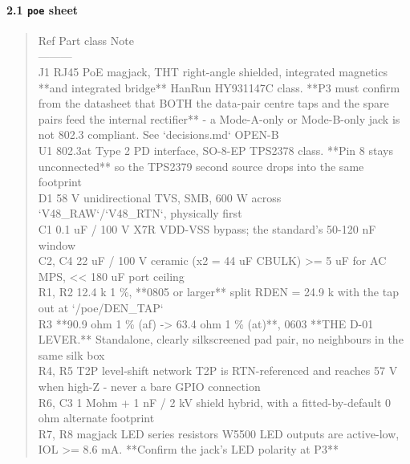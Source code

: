 \documentclass[11pt,a4paper]{article}
\begin{document}
\paragraph*{2.1 \texttt{poe} sheet}
\begin{quote}\small\ttfamily\raggedright
\textbar{} Ref \textbar{} Part class \textbar{} Note \textbar{}\\
\textbar{}---\textbar{}---\textbar{}---\textbar{}\\
\textbar{} J1 \textbar{} RJ45 PoE magjack, THT right-angle shielded, integrated magnetics {*}{*}and integrated bridge{*}{*} \textbar{} HanRun HY931147C class. {*}{*}P3 must confirm from the datasheet that BOTH the data-pair centre taps and the spare pairs feed the internal rectifier{*}{*} - a Mode-A-only or Mode-B-only jack is not 802.3 compliant. See `decisions.md` OPEN-B \textbar{}\\
\textbar{} U1 \textbar{} 802.3at Type 2 PD interface, SO-8-EP \textbar{} TPS2378 class. {*}{*}Pin 8 stays unconnected{*}{*} so the TPS2379 second source drops into the same footprint \textbar{}\\
\textbar{} D1 \textbar{} 58 V unidirectional TVS, SMB, 600 W \textbar{} across `V48\_RAW`/`V48\_RTN`, physically first \textbar{}\\
\textbar{} C1 \textbar{} 0.1 uF / 100 V X7R \textbar{} VDD-VSS bypass; the standard's 50-120 nF window \textbar{}\\
\textbar{} C2, C4 \textbar{} 22 uF / 100 V ceramic (x2 = 44 uF CBULK) \textbar{} \textgreater{}= 5 uF for AC MPS, \textless{}\textless{} 180 uF port ceiling \textbar{}\\
\textbar{} R1, R2 \textbar{} 12.4 k 1 \%, {*}{*}0805 or larger{*}{*} \textbar{} split RDEN = 24.9 k with the tap out at `/poe/DEN\_TAP` \textbar{}\\
\textbar{} R3 \textbar{} {*}{*}90.9 ohm 1 \% (af) -\textgreater{} 63.4 ohm 1 \% (at){*}{*}, 0603 \textbar{} {*}{*}THE D-01 LEVER.{*}{*} Standalone, clearly silkscreened pad pair, no neighbours in the same silk box \textbar{}\\
\textbar{} R4, R5 \textbar{} T2P level-shift network \textbar{} T2P is RTN-referenced and reaches 57 V when high-Z - never a bare GPIO connection \textbar{}\\
\textbar{} R6, C3 \textbar{} 1 Mohm + 1 nF / 2 kV \textbar{} shield hybrid, with a fitted-by-default 0 ohm alternate footprint \textbar{}\\
\textbar{} R7, R8 \textbar{} magjack LED series resistors \textbar{} W5500 LED outputs are active-low, IOL \textgreater{}= 8.6 mA. {*}{*}Confirm the jack's LED polarity at P3{*}{*} \textbar{}
\end{quote}
\end{document}
